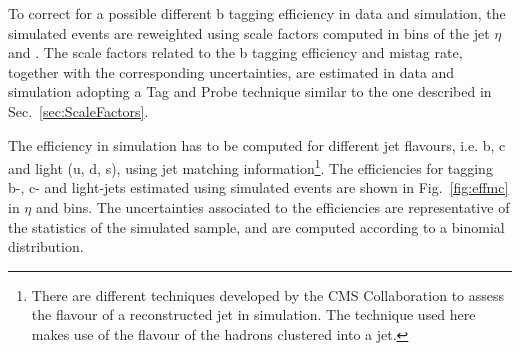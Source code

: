 To correct for a possible different b tagging efficiency in data and simulation, the simulated events are reweighted using scale factors computed in bins of the jet $\eta$ and \pt.
The scale factors related to the b tagging efficiency and mistag rate, together with the corresponding uncertainties, are estimated in data and simulation adopting a Tag and Probe technique similar to the one described in Sec.~\ref{sec:ScaleFactors}.

The efficiency in simulation has to be computed for different jet flavours, i.e. b, c and light (u, d, s), using jet matching information\footnote{There are different techniques developed by the CMS Collaboration to assess the flavour of a reconstructed jet in simulation. The technique used here makes use of the flavour of the hadrons clustered into a jet.}.
The efficiencies for tagging b-, c- and light-jets estimated using simulated \ttbar events are shown in Fig.~\ref{fig:effmc} in $\eta$ and \pt bins. The uncertainties associated to the efficiencies are representative of the statistics of the simulated \ttbar sample, and are computed according to a binomial distribution.


